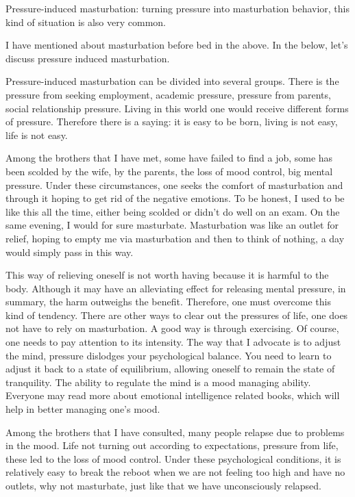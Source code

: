 \documentclass[
]{book}
\begin{document}
Pressure-induced masturbation: turning pressure into masturbation behavior, this kind of situation is also very common.

I have mentioned about masturbation before bed in the above. In the below, let's discuss pressure induced masturbation.

Pressure-induced masturbation can be divided into several groups. There is the pressure from seeking employment, academic pressure, pressure from parents, social relationship pressure. Living in this world one would receive different forms of pressure. Therefore there is a saying: it is easy to be born, living is not easy, life is not easy.

Among the brothers that I have met, some have failed to find a job, some has been scolded by the wife, by the parents, the loss of mood control, big mental pressure. Under these circumstances, one seeks the comfort of masturbation and through it hoping to get rid of the negative emotions. To be honest, I used to be like this all the time, either being scolded or didn't do well on an exam. On the same evening, I would for sure masturbate. Masturbation was like an outlet for relief, hoping to empty me via masturbation and then to think of nothing, a day would simply pass in this way.

This way of relieving oneself is not worth having because it is harmful to the body. Although it may have an alleviating effect for releasing mental pressure, in summary, the harm outweighs the benefit. Therefore, one must overcome this kind of tendency. There are other ways to clear out the pressures of life, one does not have to rely on masturbation. A good way is through exercising. Of course, one needs to pay attention to its intensity. The way that I advocate is to adjust the mind, pressure dislodges your psychological balance. You need to learn to adjust it back to a state of equilibrium, allowing oneself to remain the state of tranquility. The ability to regulate the mind is a mood managing ability. Everyone may read more about emotional intelligence related books, which will help in better managing one's mood.

Among the brothers that I have consulted, many people relapse due to problems in the mood. Life not turning out according to expectations, pressure from life, these led to the loss of mood control. Under these psychological conditions, it is relatively easy to break the reboot when we are not feeling too high and have no outlets, why not masturbate, just like that we have unconsciously relapsed.
\end{document}
